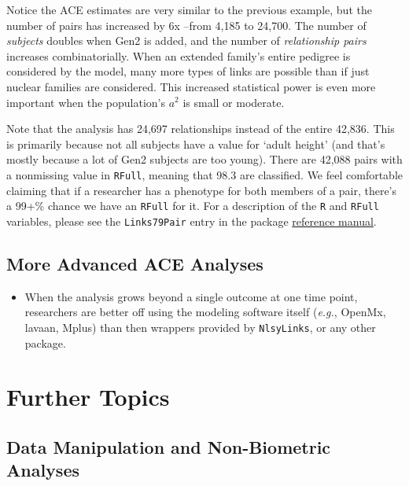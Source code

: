 \documentclass[smallextended]{svjour3}       %
\providecommand{\tightlist}{%
  \setlength{\itemsep}{0pt}\setlength{\parskip}{0pt}}
\begin{document}
Notice the ACE estimates are very similar to the previous example, but
the number of pairs has increased by 6x --from 4,185 to 24,700. The
number of \emph{subjects} doubles when Gen2 is added, and the number of
\emph{relationship pairs} increases combinatorially. When an extended
family's entire pedigree is considered by the model, many more types of
links are possible than if just nuclear families are considered. This
increased statistical power is even more important when the population's
\(a^2\) is small or moderate.

Note that the analysis has 24,697 relationships instead of the entire
42,836. This is primarily because not all subjects have a value for
`adult height' (and that's mostly because a lot of Gen2 subjects are too
young). There are 42,088 pairs with a nonmissing value in
\texttt{RFull}, meaning that 98.3 are classified. We feel comfortable
claiming that if a researcher has a phenotype for both members of a
pair, there's a 99+\% chance we have an \texttt{RFull} for it. For a
description of the \texttt{R} and \texttt{RFull} variables, please see
the \texttt{Links79Pair} entry in the package
\href{https://nlsy-links.github.io/NlsyLinks/}{reference manual}.

\hypertarget{more-advanced-ace-analyses}{%
\subsection{More Advanced ACE
Analyses}\label{more-advanced-ace-analyses}}

\begin{itemize}
\tightlist
\item
  When the analysis grows beyond a single outcome at one time point,
  researchers are better off using the modeling software itself
  (\emph{e.g.}, OpenMx, lavaan, Mplus) than then wrappers provided by
  \texttt{NlsyLinks}, or any other package.
\end{itemize}

\hypertarget{further-topics}{%
\section{Further Topics}\label{further-topics}}

\hypertarget{data-manipulation-and-non-biometric-analyses}{%
\subsection{Data Manipulation and Non-Biometric
Analyses}\label{data-manipulation-and-non-biometric-analyses}}
\end{document}
